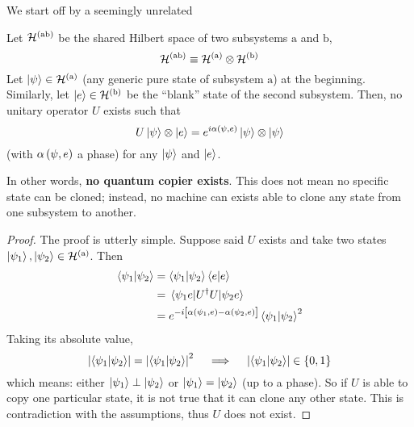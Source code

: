 We start off by a seemingly unrelated
\begin{theorem}[No-cloning]
	Let $\mathcal{H}^{(\mathrm{ab})}$ be the shared Hilbert space of two subsystems $\mathrm{a}$ and $\mathrm{b}$,
	\[
		\mathcal{H}^{(\mathrm{ab})} \equiv \mathcal{H}^{(\mathrm{a})} \otimes \mathcal{H}^{(\mathrm{b})}
	\]
	Let $\ket{\psi} \in \mathcal{H}^{(\mathrm{a})}$ (any generic pure state of subsystem $\mathrm{a}$) at the beginning. Similarly, let $\ket{e} \in \mathcal{H}^{(\mathrm{b})}$ be the ``blank'' state of the second subsystem. Then, no unitary operator $U$ exists such that
	\[
		U \ket{\psi} \otimes \ket{e} = e^{i \alpha\left({\psi,e}\right)} \ket{\psi} \otimes \ket{\psi}
	\]
	(with $\alpha\left({\psi,e}\right)$ a phase) for any $\ket{\psi}$ and $\ket{e}$.
\end{theorem}
In other words, \textbf{no quantum copier exists}. This does not mean no specific state can be cloned; instead, no machine can exists able to clone any state from one subsystem to another.

\begin{proof}
	The proof is utterly simple. Suppose said $U$ exists and take two states $\ket{\psi_1}, \ket{\psi_2} \in \mathcal{H}^{(\mathrm{a})}$. Then
	\[
	\begin{aligned}
		\braket{\psi_1}{\psi_2} &= \braket{\psi_1}{\psi_2} \braket{e}{e} \\
		&= \mel{\psi_1 e}{U^\dag U}{\psi_2 e} \\
		&= e^{-i \left[{\vphantom{A^A} \alpha\left({\psi_1,e}\right)-\alpha\left({\psi_2,e}\right) }\right]} \braket{\psi_1}{\psi_2}^2
	\end{aligned}
	\]
	Taking its absolute value,
	\[
		\abs{\braket{\psi_1}{\psi_2}} = \abs{\braket{\psi_1}{\psi_2}}^2
		\quad\implies\quad
		\abs{\braket{\psi_1}{\psi_2}} \in \lbrace 0,1 \rbrace
	\]
	which means: either $\ket{\psi_1} \perp \ket{\psi_2}$ or $\ket{\psi_1} = \ket{\psi_2}$ (up to a phase). So if $U$ is able to copy one particular state, it is not true that it can clone any other state. This is contradiction with the assumptions, thus $U$ does not exist.
\end{proof}

